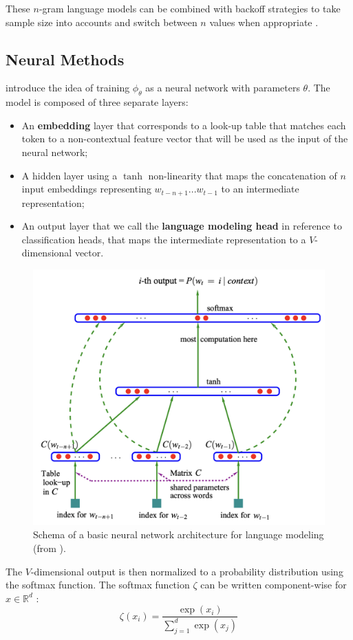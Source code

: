 These $n$-gram language models can be combined with backoff strategies to take sample size into accounts and switch between $n$ values when appropriate \citep{kneser_ney}.

\subsection{Neural Methods}
\citet{bengio2000neural} introduce the idea of training $\phi_\theta$ as a neural network with parameters $\theta$. The model is composed of three separate layers:

\begin{itemize}
    \item An \textbf{embedding} layer that corresponds to a look-up table that matches each token to a non-contextual feature vector that will be used as the input of the neural network;
    \item A hidden layer using a $\tanh$ non-linearity that maps the concatenation of $n$ input embeddings representing $w_{t-n+1}...w_{t-1}$ to an intermediate representation;
    \item An output layer that we call the \textbf{language modeling head} in reference to classification heads, that maps the intermediate representation to a $V$\!-dimensional vector.
\end{itemize}

\begin{figure}[ht]
    \centering
    \includegraphics[width=0.5\linewidth]{sources/related_works/imgs/bengio_schema.png}
    \caption{Schema of a basic neural network architecture for language modeling (from \citet{bengio2000neural}).}
    \label{fig:bengio}
\end{figure}

The $V$\!-dimensional output is then normalized to a probability distribution using the softmax function. The softmax function $\zeta$ can be written component-wise for $x \in \mathbb{R}^d$ :
$$
\zeta(x_i) = \frac{\exp(x_i)}{\sum_{j=1}^{d} \exp(x_j)}
$$

